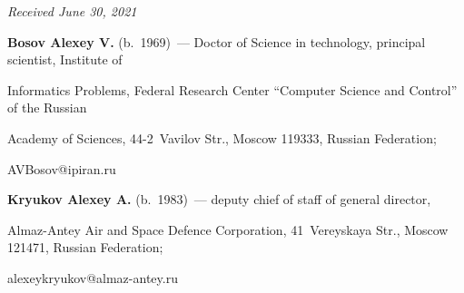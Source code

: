 




\hfill{\small\textit{Received June 30, 2021}} 










\Contr





\noindent


\textbf{Bosov Alexey V.} (b.\ 1969)~--- Doctor of Science in technology, principal scientist, Institute of 


Informatics Problems, Federal Research Center ``Computer Science and Control'' of the Russian 


Academy of Sciences, 44-2~Vavilov Str., Moscow 119333, Russian Federation; 


\mbox{AVBosov@ipiran.ru}





\vspace*{3pt}





\noindent


\textbf{Kryukov Alexey A.} (b.\ 1983)~--- deputy chief of staff of general director, 


Almaz-Antey Air and Space Defence Corporation, 41~Vereyskaya Str., Moscow 121471, Russian Federation; 


\mbox{alexeykryukov@almaz-antey.ru}








\label{end\stat}





\renewcommand{\bibname}{\protect\rm Литература} 


